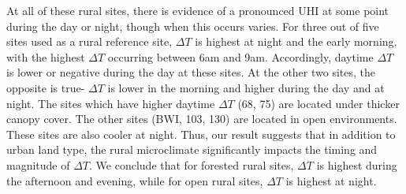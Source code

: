 At all of these rural sites, there is evidence of a pronounced UHI at some point during the day or night, though when this occurs varies.
 For three out of five sites used as a rural reference site, $\Delta T$ is highest at night and the early morning, with the highest $\Delta T$ occurring between 6am and
9am.  
Accordingly, daytime $\Delta T$ is lower or negative during the day at these sites. 
At the other two sites, the opposite is true- $\Delta T$ is lower in the morning and higher during the day and at night. 
The sites which have higher daytime $\Delta T$ (68, 75) are located under thicker canopy cover. The other sites (BWI, 103, 130) are located in open environments. These sites are also cooler at night. 
Thus, our result suggests that in addition to urban land type, the rural microclimate significantly impacts the timing and magnitude of $ \Delta T$. We conclude that for forested rural sites, $\Delta T$ is highest during the afternoon and evening, while for open rural sites, $\Delta T$ is highest at night. 

%


